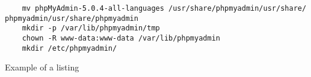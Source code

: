 \begin{listing}[H]
  \begin{verbatim}
    mv phpMyAdmin-5.0.4-all-languages /usr/share/phpmyadmin/usr/share/ phpmyadmin/usr/share/phpmyadmin
    mkdir -p /var/lib/phpmyadmin/tmp
    chown -R www-data:www-data /var/lib/phpmyadmin
    mkdir /etc/phpmyadmin/
  \end{verbatim}
  \caption{Example of a listing}
  \label{lst:example}
\end{listing}
